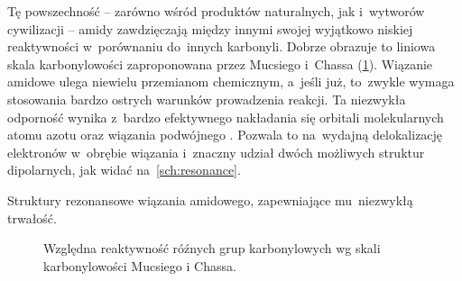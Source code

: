 Tę powszechność \--- zarówno wśród produktów naturalnych, jak i~wytworów cywilizacji \---
amidy zawdzięczają między innymi swojej wyjątkowo niskiej reaktywności w~porównaniu do~innych karbonyli.
Dobrze obrazuje to liniowa skala karbonylowości zaproponowana przez Mucsiego i~Chassa (\cref{fig:carbonyl-scale})\autocite{mucsi08}.
Wiązanie amidowe ulega niewielu przemianom chemicznym, a~jeśli już,
to~zwykle wymaga stosowania bardzo ostrych warunków prowadzenia reakcji.
Ta niezwykła odporność wynika z~bardzo efektywnego nakładania się orbitali 
molekularnych atomu azotu oraz \textpi wiązania podwójnego .
Pozwala to na~wydajną delokalizację elektronów w~obrębie wiązania i~znaczny 
udział dwóch możliwych struktur dipolarnych, jak widać na~\cref{sch:resonance}.
\begin{marginscheme}
  
  \caption{
    Struktury rezonansowe wiązania amidowego, zapewniające mu~niezwykłą trwałość.
  }
  \label{sch:resonance}
\end{marginscheme}

\begin{figure}
  \centering
  
  \caption{
    Względna reaktywność róźnych grup karbonylowych
    wg skali karbonylowości Mucsiego i Chassa.
  }
  \label{fig:carbonyl-scale}
\end{figure}


